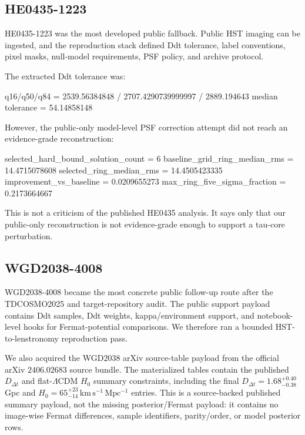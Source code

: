 \documentclass[11pt]{article}
\newenvironment{Shaded}{}{}
\newcommand{\NormalTok}[1]{#1}
\begin{document}
\subsection{HE0435-1223}\label{he0435-1223}

HE0435-1223 was the most developed public fallback. Public HST imaging
can be ingested, and the reproduction stack defined Ddt tolerance, label
conventions, pixel masks, null-model requirements, PSF policy, and
archive protocol.

The extracted Ddt tolerance was:

\begin{Shaded}
\begin{Highlighting}[]
\NormalTok{q16/q50/q84 = 2539.56384848 / 2707.4290739999997 / 2889.194643}
\NormalTok{median tolerance = 54.14858148}
\end{Highlighting}
\end{Shaded}

However, the public-only model-level PSF correction attempt did not
reach an evidence-grade reconstruction:

\begin{Shaded}
\begin{Highlighting}[]
\NormalTok{selected\_hard\_bound\_solution\_count = 6}
\NormalTok{baseline\_grid\_ring\_median\_rms = 14.4715078608}
\NormalTok{selected\_ring\_median\_rms = 14.4505423335}
\NormalTok{improvement\_vs\_baseline = 0.0209655273}
\NormalTok{max\_ring\_five\_sigma\_fraction = 0.2173664667}
\end{Highlighting}
\end{Shaded}

This is not a criticism of the published HE0435 analysis. It says only
that our public-only reconstruction is not evidence-grade enough to
support a tau-core perturbation.

\subsection{WGD2038-4008}\label{wgd2038-4008}

WGD2038-4008 became the most concrete public follow-up route after the
TDCOSMO2025 and target-repository audit. The public support payload
contains Ddt samples, Ddt weights, kappa/environment support, and
notebook-level hooks for Fermat-potential comparisons. We therefore ran
a bounded HST-to-lenstronomy reproduction pass.

We also acquired the WGD2038 arXiv source-table payload from the
official arXiv \(2406.02683\) source bundle. The materialized tables
contain the published \(D_{\Delta t}\) and flat-\(\Lambda\)CDM \(H_0\)
summary constraints, including the final
\(D_{\Delta t}=1.68^{+0.40}_{-0.38}\) Gpc and
\(H_0=65^{+23}_{-14}\,\mathrm{km\,s^{-1}\,Mpc^{-1}}\) entries. This is a
source-backed published summary payload, not the missing posterior/Fermat
payload: it contains no image-wise Fermat differences, sample identifiers,
parity/order, or model posterior rows.
\end{document}
